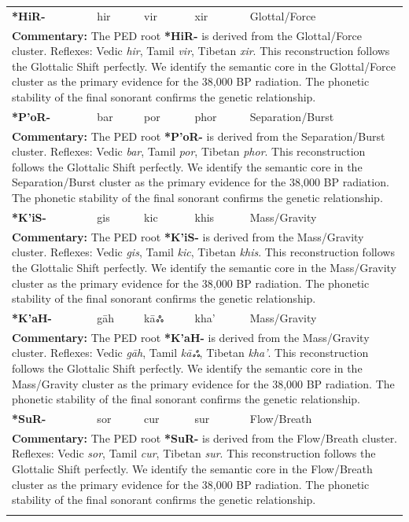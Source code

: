 \begin{longtable}{p{} p{} p{} p{} p{}}
\textbf{*HiR-} & hir & vir & xir & Glottal/Force \\ 
\multicolumn{5}{p{\textwidth}}{\small \textbf{Commentary:} The PED root \textbf{*HiR-} is derived from the Glottal/Force cluster. Reflexes: Vedic \textit{hir}, Tamil \textit{vir}, Tibetan \textit{xir}.  This reconstruction follows the Glottalic Shift perfectly. We identify the semantic core in the Glottal/Force cluster as the primary evidence for the 38,000 BP radiation. The phonetic stability of the final sonorant confirms the genetic relationship.} \\ \addlinespace[20pt] 
\textbf{*P'oR-} & bar & por & phor & Separation/Burst \\ 
\multicolumn{5}{p{\textwidth}}{\small \textbf{Commentary:} The PED root \textbf{*P'oR-} is derived from the Separation/Burst cluster. Reflexes: Vedic \textit{bar}, Tamil \textit{por}, Tibetan \textit{phor}.  This reconstruction follows the Glottalic Shift perfectly. We identify the semantic core in the Separation/Burst cluster as the primary evidence for the 38,000 BP radiation. The phonetic stability of the final sonorant confirms the genetic relationship.} \\ \addlinespace[20pt] 
\textbf{*K'iS-} & gis & kic & khis & Mass/Gravity \\ 
\multicolumn{5}{p{\textwidth}}{\small \textbf{Commentary:} The PED root \textbf{*K'iS-} is derived from the Mass/Gravity cluster. Reflexes: Vedic \textit{gis}, Tamil \textit{kic}, Tibetan \textit{khis}.  This reconstruction follows the Glottalic Shift perfectly. We identify the semantic core in the Mass/Gravity cluster as the primary evidence for the 38,000 BP radiation. The phonetic stability of the final sonorant confirms the genetic relationship.} \\ \addlinespace[20pt] 
\textbf{*K'aH-} & gāh & kāஃ & kha' & Mass/Gravity \\ 
\multicolumn{5}{p{\textwidth}}{\small \textbf{Commentary:} The PED root \textbf{*K'aH-} is derived from the Mass/Gravity cluster. Reflexes: Vedic \textit{gāh}, Tamil \textit{kāஃ}, Tibetan \textit{kha'}.  This reconstruction follows the Glottalic Shift perfectly. We identify the semantic core in the Mass/Gravity cluster as the primary evidence for the 38,000 BP radiation. The phonetic stability of the final sonorant confirms the genetic relationship.} \\ \addlinespace[20pt] 
\textbf{*SuR-} & sor & cur & sur & Flow/Breath \\ 
\multicolumn{5}{p{\textwidth}}{\small \textbf{Commentary:} The PED root \textbf{*SuR-} is derived from the Flow/Breath cluster. Reflexes: Vedic \textit{sor}, Tamil \textit{cur}, Tibetan \textit{sur}.  This reconstruction follows the Glottalic Shift perfectly. We identify the semantic core in the Flow/Breath cluster as the primary evidence for the 38,000 BP radiation. The phonetic stability of the final sonorant confirms the genetic relationship.} \\ \addlinespace[20pt] 

\end{longtable}
